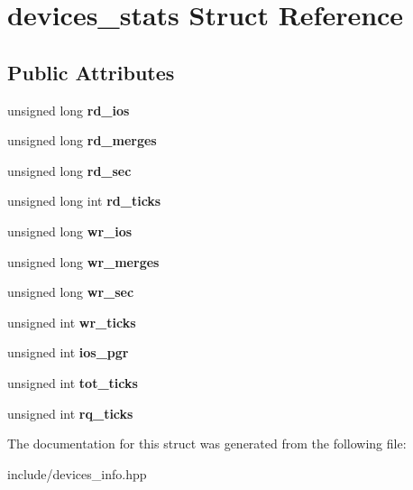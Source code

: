 \hypertarget{structdevices__stats}{}\section{devices\+\_\+stats Struct Reference}
\label{structdevices__stats}
\subsection*{Public Attributes}
\begin{DoxyCompactItemize}
\item 
\mbox{\label{structdevices__stats_a74e53b83ba7bce8a8441177f8aa953a6}} 
unsigned long {\bfseries rd\+\_\+ios}
\item 
\mbox{\label{structdevices__stats_a415a368b775a186f09daef7096d15258}} 
unsigned long {\bfseries rd\+\_\+merges}
\item 
\mbox{\label{structdevices__stats_a8208c1036ae20e1d52e06d8feb08e299}} 
unsigned long {\bfseries rd\+\_\+sec}
\item 
\mbox{\label{structdevices__stats_a93ba92e2482bca8429f0578a8636c643}} 
unsigned long int {\bfseries rd\+\_\+ticks}
\item 
\mbox{\label{structdevices__stats_a2ef47237d3460843e20d13b91ebdd695}} 
unsigned long {\bfseries wr\+\_\+ios}
\item 
\mbox{\label{structdevices__stats_abeb017b93a34d65f3afa1ad24320540c}} 
unsigned long {\bfseries wr\+\_\+merges}
\item 
\mbox{\label{structdevices__stats_af16f9a10cc8fc1c0d41417a83e7c7ec1}} 
unsigned long {\bfseries wr\+\_\+sec}
\item 
\mbox{\label{structdevices__stats_a4c0bc163e76787b73e7de6dddce786f7}} 
unsigned int {\bfseries wr\+\_\+ticks}
\item 
\mbox{\label{structdevices__stats_a307f7d57ed7f7a2181b9011d3283aecc}} 
unsigned int {\bfseries ios\+\_\+pgr}
\item 
\mbox{\label{structdevices__stats_a725accaeacca107d1769860e018fb725}} 
unsigned int {\bfseries tot\+\_\+ticks}
\item 
\mbox{\label{structdevices__stats_a2a0ac8fc68ed152ecc05cb1de627bcd1}} 
unsigned int {\bfseries rq\+\_\+ticks}
\end{DoxyCompactItemize}


The documentation for this struct was generated from the following file\+:\begin{DoxyCompactItemize}
\item 
include/devices\+\_\+info.\+hpp\end{DoxyCompactItemize}
